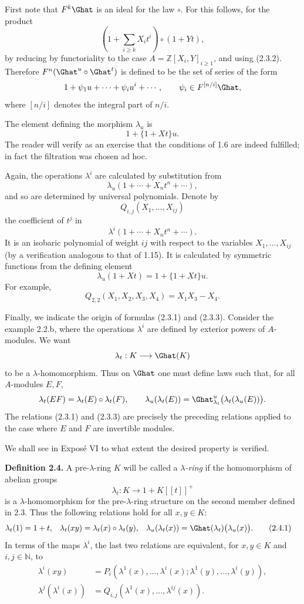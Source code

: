 \documentclass[11pt]{article}
\begin{document}
First note that \(F^k\Ghat\) is an ideal for the law \(\circ\). For this follows, for the product
\[
  \left(1+\sum_{i\geq k}X_i t^i\right)\circ(1+Yt),
\]
by reducing by functoriality to the case \(A=\mathbb Z[X_i,Y]_{i\geq 1}\), and using (2.3.2). Therefore \(F^n(\Ghat^u\circ\Ghat^t)\) is defined to be the set of series of the form
\[
  1+\psi_1u+\cdots+\psi_iu^i+\cdots,\qquad
  \psi_i\in F^{[n/i]}\Ghat,
\]
where \([n/i]\) denotes the integral part of \(n/i\).

The element defining the morphism \(\lambda_u\) is
\[
  1+\{1+Xt\}u.
\]
The reader will verify as an exercise that the conditions of 1.6 are indeed fulfilled; in fact the filtration was chosen ad hoc.

Again, the operations \(\lambda^i\) are calculated by substitution from
\[
  \lambda_u(1+\cdots+X_nt^n+\cdots),
\]
and so are determined by universal polynomials. Denote by
\[
  Q_{i,j}(X_1,\ldots,X_{ij})
\]
the coefficient of \(t^j\) in
\[
  \lambda^i(1+\cdots+X_nt^n+\cdots).
\]
It is an isobaric polynomial of weight \(ij\) with respect to the variables \(X_1,\ldots,X_{ij}\) (by a verification analogous to that of 1.15). It is calculated by symmetric functions from the defining element
\begin{equation}\tag{2.3.3}
  \lambda_u(1+Xt)=1+\{1+Xt\}u .
\end{equation}
For example,
\[
  Q_{2,2}(X_1,X_2,X_3,X_4)=X_1X_3-X_4.
\]

Finally, we indicate the origin of formulas (2.3.1) and (2.3.3). Consider the example 2.2.b, where the operations \(\lambda^i\) are defined by exterior powers of \(A\)-modules. We want
\[
  \lambda_t:K\longrightarrow \Ghat(K)
\]
to be a \(\lambda\)-homomorphism. Thus on \(\Ghat\) one must define laws such that, for all \(A\)-modules \(E,F\),
\[
  \lambda_t(EF)=\lambda_t(E)\circ\lambda_t(F),\qquad
  \lambda_u(\lambda_t(E))=\Ghat^u_{\lambda_t}\bigl(\lambda_t(\lambda_u(E))\bigr).
\]
The relations (2.3.1) and (2.3.3) are precisely the preceding relations applied to the case where \(E\) and \(F\) are invertible modules.

We shall see in Exposé VI to what extent the desired property is verified.

\textbf{Definition 2.4.} A pre-\(\lambda\)-ring \(K\) will be called a \emph{\(\lambda\)-ring} if the homomorphism of abelian groups
\[
  \lambda_t:K\longrightarrow 1+K[[t]]^+
\]
is a \(\lambda\)-homomorphism for the pre-\(\lambda\)-ring structure on the second member defined in 2.3. Thus the following relations hold for all \(x,y\in K\):
\begin{align}
  \lambda_t(1)&=1+t,&
  \lambda_t(xy)&=\lambda_t(x)\circ\lambda_t(y),&
  \lambda_u(\lambda_t(x))&=\Ghat(\lambda_t)\bigl(\lambda_u(x)\bigr).
  \tag{2.4.1}
\end{align}
In terms of the maps \(\lambda^i\), the last two relations are equivalent, for \(x,y\in K\) and \(i,j\in\mathbb N\), to
\begin{align}
  \lambda^i(xy)
  &=P_i(\lambda^1(x),\ldots,\lambda^i(x);
       \lambda^1(y),\ldots,\lambda^i(y)), \tag{2.4.2}\\
  \lambda^j(\lambda^i(x))
  &=Q_{i,j}(\lambda^1(x),\ldots,\lambda^{ij}(x)). \tag{2.4.3}
\end{align}
\end{document}
